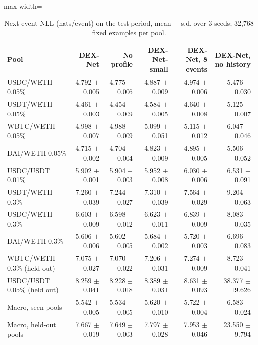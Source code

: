 \begin{table}[t]
\centering
\small
\caption{Next-event NLL (nats/event) on the test period, mean $\pm$ s.d. over 3 seeds; 32,768 fixed examples per pool.}
\label{tab:nll_by_pool}
\begin{adjustbox}{max width=\linewidth}
\begin{tabular}{lrrrrr}
\toprule
Pool & DEX-Net & No profile & DEX-Net-small & DEX-Net, 8 events & DEX-Net, no history \\
\midrule
USDC/WETH 0.05\% & 4.792 $\pm$ 0.005 & 4.775 $\pm$ 0.006 & 4.887 $\pm$ 0.009 & 4.974 $\pm$ 0.006 & 5.476 $\pm$ 0.030 \\
USDT/WETH 0.05\% & 4.461 $\pm$ 0.003 & 4.454 $\pm$ 0.009 & 4.584 $\pm$ 0.005 & 4.640 $\pm$ 0.008 & 5.125 $\pm$ 0.007 \\
WBTC/WETH 0.05\% & 4.998 $\pm$ 0.007 & 4.988 $\pm$ 0.009 & 5.099 $\pm$ 0.051 & 5.115 $\pm$ 0.012 & 6.047 $\pm$ 0.046 \\
DAI/WETH 0.05\% & 4.715 $\pm$ 0.002 & 4.704 $\pm$ 0.004 & 4.823 $\pm$ 0.009 & 4.895 $\pm$ 0.005 & 5.506 $\pm$ 0.052 \\
USDC/USDT 0.01\% & 5.902 $\pm$ 0.001 & 5.904 $\pm$ 0.003 & 5.952 $\pm$ 0.008 & 6.030 $\pm$ 0.006 & 6.531 $\pm$ 0.091 \\
USDT/WETH 0.3\% & 7.260 $\pm$ 0.039 & 7.244 $\pm$ 0.027 & 7.310 $\pm$ 0.039 & 7.564 $\pm$ 0.029 & 9.204 $\pm$ 0.063 \\
USDC/WETH 0.3\% & 6.603 $\pm$ 0.009 & 6.598 $\pm$ 0.012 & 6.623 $\pm$ 0.011 & 6.839 $\pm$ 0.009 & 8.083 $\pm$ 0.035 \\
DAI/WETH 0.3\% & 5.606 $\pm$ 0.006 & 5.602 $\pm$ 0.005 & 5.684 $\pm$ 0.002 & 5.720 $\pm$ 0.003 & 6.696 $\pm$ 0.083 \\
WBTC/WETH 0.3\% (held out) & 7.075 $\pm$ 0.027 & 7.070 $\pm$ 0.022 & 7.206 $\pm$ 0.031 & 7.274 $\pm$ 0.009 & 8.723 $\pm$ 0.041 \\
USDC/USDT 0.05\% (held out) & 8.259 $\pm$ 0.041 & 8.228 $\pm$ 0.018 & 8.389 $\pm$ 0.031 & 8.631 $\pm$ 0.093 & 38.377 $\pm$ 19.626 \\
\midrule
Macro, seen pools & 5.542 $\pm$ 0.005 & 5.534 $\pm$ 0.005 & 5.620 $\pm$ 0.010 & 5.722 $\pm$ 0.004 & 6.583 $\pm$ 0.024 \\
Macro, held-out pools & 7.667 $\pm$ 0.019 & 7.649 $\pm$ 0.003 & 7.797 $\pm$ 0.028 & 7.953 $\pm$ 0.046 & 23.550 $\pm$ 9.794 \\
\bottomrule
\end{tabular}
\end{adjustbox}
\end{table}
